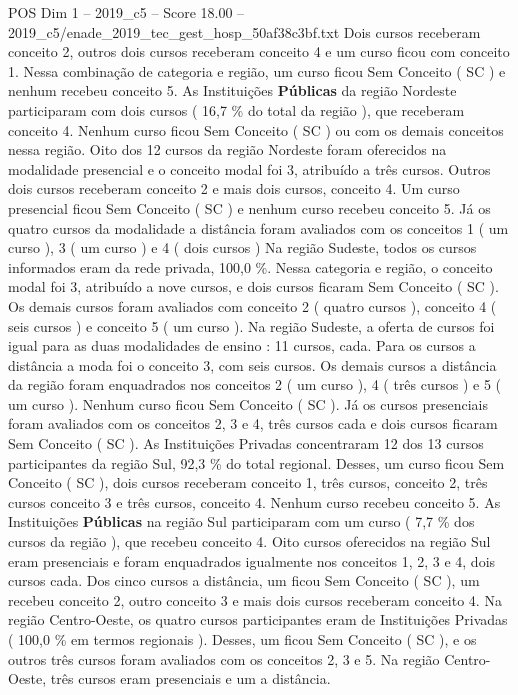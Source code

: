 \begin{textsample}{POS Dim 1 – 2019\_c5 – Score 18.00 – 2019\_c5/enade\_2019\_tec\_gest\_hosp\_50af38c3bf.txt}
Dois cursos receberam conceito 2, outros dois cursos receberam conceito 4 e um curso ficou com conceito 1.
Nessa combinação de categoria e região, um curso ficou Sem Conceito ( SC ) e nenhum recebeu conceito 5.
As Instituições \textbf{Públicas} da região Nordeste participaram com dois cursos ( 16,7 \% do total da região ), que receberam conceito 4.
Nenhum curso ficou Sem Conceito ( SC ) ou com os demais conceitos nessa região.
Oito dos 12 cursos da região Nordeste foram oferecidos na modalidade presencial e o conceito modal foi 3, atribuído a três cursos.
Outros dois cursos receberam conceito 2 e mais dois cursos, conceito 4.
Um curso presencial ficou Sem Conceito ( SC ) e nenhum curso recebeu conceito 5.
Já os quatro cursos da modalidade a distância foram avaliados com os conceitos 1 ( um curso ), 3 ( um curso ) e 4 ( dois cursos ) Na região Sudeste, todos os cursos informados eram da rede privada, 100,0 \%.
Nessa categoria e região, o conceito modal foi 3, atribuído a nove cursos, e dois cursos ficaram Sem Conceito ( SC ).
Os demais cursos foram avaliados com conceito 2 ( quatro cursos ), conceito 4 ( seis cursos ) e conceito 5 ( um curso ).
Na região Sudeste, a oferta de cursos foi igual para as duas modalidades de ensino : 11 cursos, cada.
Para os cursos a distância a moda foi o conceito 3, com seis cursos.
Os demais cursos a distância da região foram enquadrados nos conceitos 2 ( um curso ), 4 ( três cursos ) e 5 ( um curso ).
Nenhum curso ficou Sem Conceito ( SC ).
Já os cursos presenciais foram avaliados com os conceitos 2, 3 e 4, três cursos cada e dois cursos ficaram Sem Conceito ( SC ).
As Instituições Privadas concentraram 12 dos 13 cursos participantes da região Sul, 92,3 \% do total regional.
Desses, um curso ficou Sem Conceito ( SC ), dois cursos receberam conceito 1, três cursos, conceito 2, três cursos conceito 3 e três cursos, conceito 4.
Nenhum curso recebeu conceito 5.
As Instituições \textbf{Públicas} na região Sul participaram com um curso ( 7,7 \% dos cursos da região ), que recebeu conceito 4.
Oito cursos oferecidos na região Sul eram presenciais e foram enquadrados igualmente nos conceitos 1, 2, 3 e 4, dois cursos cada.
Dos cinco cursos a distância, um ficou Sem Conceito ( SC ), um recebeu conceito 2, outro conceito 3 e mais dois cursos receberam conceito 4.
Na região Centro-Oeste, os quatro cursos participantes eram de Instituições Privadas ( 100,0 \% em termos regionais ).
Desses, um ficou Sem Conceito ( SC ), e os outros três cursos foram avaliados com os conceitos 2, 3 e 5.
Na região Centro-Oeste, três cursos eram presenciais e um a distância.

\end{textsample}
